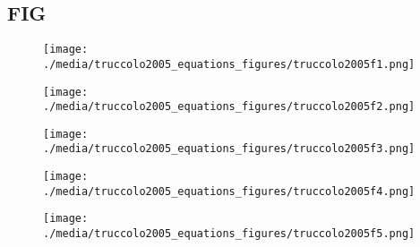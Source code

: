\documentclass[svgnames,13pt]{beamer}
\begin{document}
\subsection{ FIG}

\begin{frame}{}
\begin{figure}\centering\texttt{[image: ./media/truccolo2005\_equations\_figures/truccolo2005f1.png]}\\\end{figure}
\end{frame} 

\begin{frame}{}
\begin{figure}\centering\texttt{[image: ./media/truccolo2005\_equations\_figures/truccolo2005f2.png]}\\\end{figure}
\end{frame} 

\begin{frame}{}
\begin{figure}\centering\texttt{[image: ./media/truccolo2005\_equations\_figures/truccolo2005f3.png]}\\\end{figure}
\end{frame} 

\begin{frame}{}
\begin{figure}\centering\texttt{[image: ./media/truccolo2005\_equations\_figures/truccolo2005f4.png]}\\\end{figure}
\end{frame} 

\begin{frame}{}
\begin{figure}\centering\texttt{[image: ./media/truccolo2005\_equations\_figures/truccolo2005f5.png]}\\\end{figure}
\end{frame} 
\end{document}
